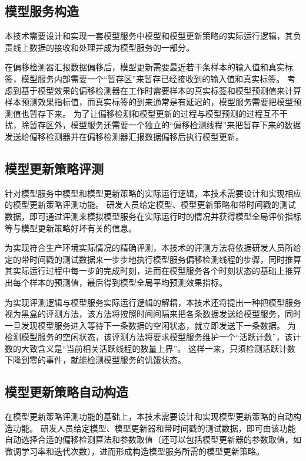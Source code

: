 \subsection{模型服务构造}

本技术需要设计和实现一套模型服务中模型和模型更新策略的实际运行逻辑，其负责线上数据的接收和处理并成为模型服务的一部分。

在偏移检测器汇报数据偏移后，模型更新需要最近若干条样本的输入值和真实标签，模型服务内部需要一个“暂存区”来暂存已经接收到的输入值和真实标签。
考虑到基于模型效果的偏移检测器在工作时需要样本的真实标签和模型预测值来计算样本预测效果指标值，而真实标签的到来通常是有延迟的，模型服务需要把模型预测值也暂存下来。
为了让偏移检测和模型更新的过程与模型预测的过程互不干扰，除暂存区外，模型服务还需要一个独立的“偏移检测线程”来把暂存下来的数据发送给偏移检测器并在偏移检测器汇报数据偏移后执行模型更新。

\subsection{模型更新策略评测}

针对模型服务中模型和模型更新策略的实际运行逻辑，本技术需要设计和实现相应的模型更新策略评测功能。
研发人员给定模型、模型更新策略和带时间戳的测试数据，即可通过评测来模拟模型服务在实际运行时的情况并获得模型全局评价指标等与模型更新策略好坏有关的信息。

为实现符合生产环境实际情况的精确评测，本技术的评测方法将依据研发人员所给定的带时间戳的测试数据来一步步地执行模型服务偏移检测线程的步骤，同时推算其实际运行过程中每一步的完成时刻，进而在模型服务各个时刻状态的基础上推算出每个样本的预测值，最后得到模型全局平均预测效果指标。

为实现评测逻辑与模型服务实际运行逻辑的解耦，本技术还将提出一种把模型服务视为黑盒的评测方法，该方法将按照时间间隔来把各条数据发送给模型服务，同时一旦发现模型服务进入等待下一条数据的空闲状态，就立即发送下一条数据。
为检测模型服务的空闲状态，该评测方法将要求模型服务维护一个“活跃计数”，该计数的大致含义是“当前相关活跃线程的数量上界”。
这样一来，只须检测活跃计数下降到零的事件，就能检测模型服务的饥饿状态。

\subsection{模型更新策略自动构造}

在模型更新策略评测功能的基础上，本技术需要设计和实现模型更新策略的自动构造功能。
研发人员给定模型、模型更新器和带时间戳的测试数据，即可由该功能自动选择合适的偏移检测算法和参数取值（还可以包括模型更新器的参数取值，如微调学习率和迭代次数），进而形成构造模型服务所需的模型更新策略。

